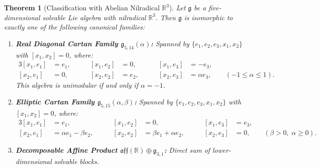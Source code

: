 \documentclass[11pt,a4paper]{article}
\newtheorem{theorem}{Theorem}[section]
\theoremstyle{definition}
\theoremstyle{remark}
\newcommand{\R}{\mathbb{R}}
\newcommand{\g}{\mathfrak{g}}
\begin{document}
\begin{theorem}[Classification with Abelian Nilradical $\R^3$]\label{thm:R3_codim2}
Let $\g$ be a five-dimensional solvable Lie algebra with nilradical $\R^3$. Then $\g$ is isomorphic to exactly one of the following canonical families:
\begin{enumerate}
    \item \textbf{Real Diagonal Cartan Family $\g_{5,14}(\alpha)$:}
    Spanned by $\{e_1, e_2, e_3, x_1, x_2\}$ with $[x_1, x_2] = 0$, where:
    \begin{alignat}{3}
        [x_1, e_1] &= e_1, &\qquad [x_1, e_2] &= 0, &\qquad [x_1, e_3] &= -e_3, \\
        [x_2, e_1] &= 0, &\qquad [x_2, e_2] &= e_2, &\qquad [x_2, e_3] &= \alpha e_3, \qquad (-1 \le \alpha \le 1).
    \end{alignat}
    This algebra is unimodular if and only if $\alpha = -1$.
    
    \item \textbf{Elliptic Cartan Family $\g_{5,15}(\alpha, \beta)$:}
    Spanned by $\{e_1, e_2, e_3, x_1, x_2\}$ with $[x_1, x_2] = 0$, where:
    \begin{alignat}{3}
        [x_1, e_1] &= e_1, &\qquad [x_1, e_2] &= 0, &\qquad [x_1, e_3] &= e_3, \\
        [x_2, e_1] &= \alpha e_1 - \beta e_2, &\qquad [x_2, e_2] &= \beta e_1 + \alpha e_2, &\qquad [x_2, e_3] &= 0, \qquad (\beta > 0, \; \alpha \ge 0).
    \end{alignat}
    
    \item \textbf{Decomposable Affine Product $\mathfrak{aff}(\R) \oplus \mathfrak{g}_{3,1}$:}
    Direct sum of lower-dimensional solvable blocks.
\end{enumerate}
\end{theorem}
\end{document}
